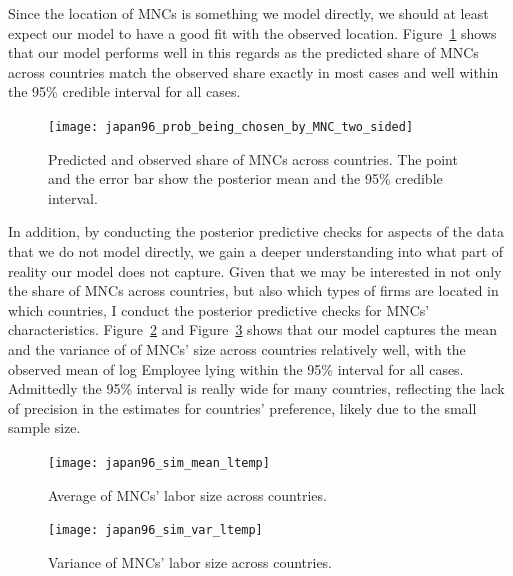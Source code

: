 Since the location of MNCs is something we model directly, we should at least
expect our model to have a good fit with the observed location.
Figure~\ref{fig:japan96_prob_being_chosen_by_MNC_two_sided} shows that our model
performs well in this regards as the predicted share of MNCs across countries
match the observed share exactly in most cases and well within the 95\% credible
interval for all cases. 

\begin{figure}[!ht] \centering
\texttt{[image: japan96\_prob\_being\_chosen\_by\_MNC\_two\_sided]}
  \caption[Predicted and observed MNCs' distribution across Asia.]{Predicted and
    observed share of MNCs across countries. The point and the error
bar show the posterior mean and the 95\% credible interval.}
  \label{fig:japan96_prob_being_chosen_by_MNC_two_sided}
\end{figure}

In addition, by conducting the posterior predictive checks for aspects of the
data that we do not model directly, we gain a deeper understanding into what
part of reality our model does not capture. Given that we may be interested in
not only the share of MNCs across countries, but also which types of firms are
located in which countries, I conduct the posterior predictive checks for MNCs'
characteristics. Figure~\ref{fig:japan96_sim_mean_ltemp} and
Figure~\ref{fig:japan96_sim_var_ltemp} shows that our model captures the mean
and the variance of of MNCs' size across countries relatively well, with the
observed mean of log Employee lying within the 95\% interval for all cases.
Admittedly the 95\% interval is really wide for many countries, reflecting the
lack of precision in the estimates for countries' preference, likely due to the
small sample size.

\begin{figure}[!ht] \centering
\texttt{[image: japan96\_sim\_mean\_ltemp]}
  \caption[Predicted and observed MNCs' size across countries.]{Average of MNCs' labor size across countries.}
  \label{fig:japan96_sim_mean_ltemp}
\end{figure}

\begin{figure}[!ht] \centering
\texttt{[image: japan96\_sim\_var\_ltemp]}
  \caption[Predicted and observed variance of MNCs' size across countries.]{Variance of MNCs' labor size across countries.}
  \label{fig:japan96_sim_var_ltemp}
\end{figure}

